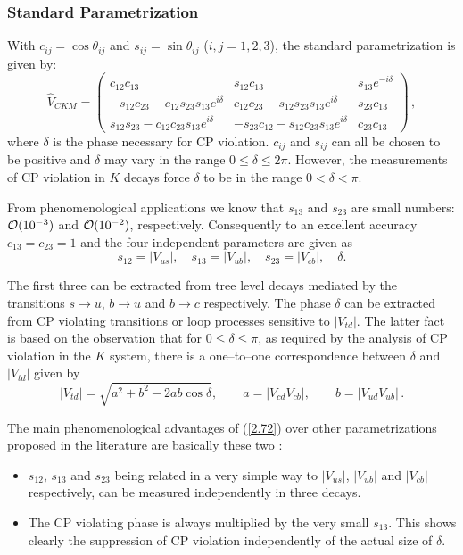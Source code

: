 \documentclass[12pt,rotate]{article}
\newcommand{\ord}{{\cal O}}
\begin{document}
\begin{itemize}
\subsubsection{Standard Parametrization}
            \label{sec:sewm:stdparam}
With
$c_{ij}=\cos\theta_{ij}$ and $s_{ij}=\sin\theta_{ij}$ 
($i,j=1,2,3$), the standard parametrization is
given by:
\begin{equation}\label{2.72}
\hat V_{CKM}=
\left(\begin{array}{ccc}
c_{12}c_{13}&s_{12}c_{13}&s_{13}e^{-i\delta}\\ -s_{12}c_{23}
-c_{12}s_{23}s_{13}e^{i\delta}&c_{12}c_{23}-s_{12}s_{23}s_{13}e^{i\delta}&
s_{23}c_{13}\\ s_{12}s_{23}-c_{12}c_{23}s_{13}e^{i\delta}&-s_{23}c_{12}
-s_{12}c_{23}s_{13}e^{i\delta}&c_{23}c_{13}
\end{array}\right)\,,
\end{equation}
where $\delta$ is the phase necessary for {\rm CP} violation.
$c_{ij}$ and
$s_{ij}$ can all be chosen to be positive
and  $\delta$ may vary in the
range $0\le\delta\le 2\pi$. However, the measurements
of CP violation in $K$ decays force $\delta$ to be in the range
 $0<\delta<\pi$. 

From phenomenological applications we know that 
$s_{13}$ and $s_{23}$ are small numbers: $\ord(10^{-3})$ and ${\cal
O}(10^{-2})$,
respectively. Consequently to an excellent accuracy $c_{13}=c_{23}=1$
and the four independent parameters are given as 
\begin{equation}\label{2.73}
s_{12}=| V_{us}|, \quad s_{13}=| V_{ub}|, \quad s_{23}=|
V_{cb}|, \quad \delta.
\end{equation}

The first three can be extracted from tree level decays mediated
by the transitions $s \to u$, $b \to u$ and $b \to c$ respectively.
The phase $\delta$ can be extracted from CP violating transitions or 
loop processes sensitive to $| V_{td}|$. The latter fact is based
on the observation that
 for $0\le\delta\le\pi$, as required by the analysis of CP violation
in the $K$ system,
there is a one--to--one correspondence between $\delta$ and $|V_{td}|$
given by
\begin{equation}\label{10}
| V_{td}|=\sqrt{a^2+b^2-2 a b \cos\delta},
\qquad
a=| V_{cd} V_{cb}|,
\qquad
b=| V_{ud} V_{ub}|\,.
\end{equation} 

The main  phenomenological advantages of (\ref{2.72}) over other
parametrizations proposed in the literature are basically these
two \cite{HALE} : 
\begin{itemize}
\item
$s_{12}$, $s_{13}$ and $s_{23}$ being related in a very simple way
to $| V_{us}|$, $| V_{ub}|$ and $|V_{cb}|$ respectively, can be
measured independently in three decays.
\item
The CP violating phase is always multiplied by the very small
$s_{13}$. This shows clearly the suppression of CP violation
independently of the actual size of $\delta$.
\end{itemize}


\end{itemize}
\end{document}
